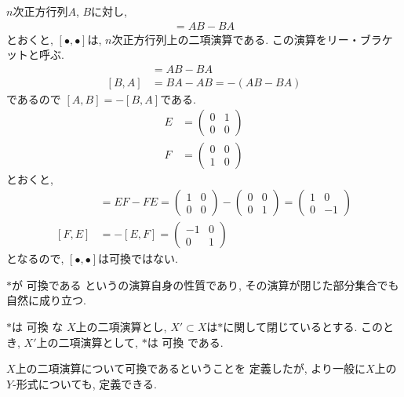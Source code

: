 \begin{nonexample}
  $n$次正方行列$A$, $B$に対し,
  \begin{align*}
    [A,B]=AB-BA
  \end{align*}
  とおくと,
  $[\bullet,\bullet]$は,
  $n$次正方行列上の二項演算である.
  この演算をリー・ブラケットと呼ぶ.
  \begin{align*}
    [A,B]&=AB-BA\\
    [B,A]&=BA-AB=-(AB-BA)
  \end{align*}
  であるので
  $[A,B]=-[B,A]$である.
  \begin{align*}
    E&=\begin{pmatrix}0&1\\0&0\end{pmatrix}\\
    F&=\begin{pmatrix}0&0\\1&0\end{pmatrix}
  \end{align*}
  とおくと,
  \begin{align*}
    [E,F]&=EF-FE=
    \begin{pmatrix}
      1&0\\0&0
    \end{pmatrix}
    -
    \begin{pmatrix}
      0&0\\0&1
    \end{pmatrix}
    =
    \begin{pmatrix}
      1&0\\0&-1
    \end{pmatrix}\\
    [F,E]&=-[E,F]=
    \begin{pmatrix}
      -1&0\\0&1
    \end{pmatrix}
  \end{align*}
  となるので, $[\bullet,\bullet]$は可換ではない.
\end{nonexample}

$\ast$が
可換である
というの演算自身の性質であり,
その演算が閉じた部分集合でも自然に成り立つ.
\begin{prop}
  $\ast$は
  可換
  な
  $X$上の二項演算とし,
  $X'\subset X$は$\ast$に関して閉じているとする.
  このとき,
  $X'$上の二項演算として,
  $\ast$は
  可換
  である.
\end{prop}

$X$上の二項演算について可換であるということを
定義したが,
より一般に$X$上の$Y$-形式についても,
定義できる.


